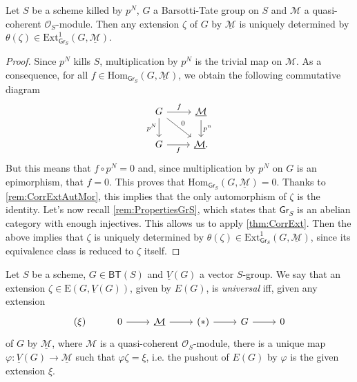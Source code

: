\documentclass[../Main]{subfiles}
\begin{document}
\begin{lem}\label{lem:rigidityExt}
	Let $S$ be a scheme killed by $p^N$, $G$ a Barsotti-Tate group on $S$
	and $\mathcal{M}$ a quasi-coherent $\mathcal{O}_S$-module.
	Then any extension $\zeta$ of $G$ by $\underline{\mathcal{M}}$ is
	uniquely determined by $\theta(\zeta) \in 
	\mathrm{Ext}^1_{\mathsf{Gr}_S}(G, \underline{\mathcal{M}})$.
\end{lem} 
\begin{proof}
	Since $p^N$ kills $S$, multiplication by $p^N$ 
	is the trivial map on $\mathcal{M}$.
	As a consequence, for all $f \in \mathrm{Hom}_{\mathsf{Gr}_S}
	\left( G, \underline{\mathcal{M}} \right)$,
	we obtain the following commutative diagram
	\begin{equation*}
	\begin{tikzcd}
		G \arrow[r, "f", rightarrow] 
		\arrow[d, "p^N"', rightarrow] 
		\arrow[rd, "0", rightarrow] &
		\underline{\mathcal{M}} \arrow[d, "p^n", rightarrow] \\
		G \arrow[r, "f"', rightarrow] &
		\underline{\mathcal{M}}
	.\end{tikzcd}
	\end{equation*}
	But this means that $f \circ p^N = 0$ and, since multiplication
	by $p^N$ on $G$ is an epimorphism, that $f = 0$.
	This proves that $\mathrm{Hom}_{ \mathsf{Gr}_S } \left( G, \underline{\mathcal{M}} \right) = 0$.
	Thanks to \cref{rem:CorrExtAutMor}, this implies that
	the only automorphism of $\zeta$ is the identity.
	Let's now recall \cref{rem:PropertiesGrS},
	which states that $\mathsf{Gr}_S$ is an abelian category with enough injectives.
	This allows us to apply \cref{thm:CorrExt}.
	Then the above implies that $\zeta$ is uniquely determined by $\theta(\zeta)
	\in \mathrm{Ext}^1_{\mathsf{Gr}_S}(G, \underline{\mathcal{M}})$,
	since its equivalence class is reduced to $\zeta$ itself.
\end{proof}


\begin{defn}
	Let $S$ be a scheme, $G \in \mathsf{BT}(S)$
	and $\underline{V}(G)$ a vector $S$-group.
	We say that an extension $\zeta \in \mathrm{E}(G, \underline{V}(G))$, given
	by $E(G)$, is {\em universal} iff, given any extension
	\begin{equation*}
	\begin{tikzcd}
		(\xi) &
		0 \arrow[r, "", rightarrow] &
		\underline{\mathcal{M}} \arrow[r, "", rightarrow] &
		(*) \arrow[r, "", rightarrow] &
		G \arrow[r, "", rightarrow] &
		0
	\end{tikzcd}
	\end{equation*}
	of $G$ by $\underline{\mathcal{M}}$, where $\mathcal{M}$ is a quasi-coherent
	$\mathcal{O}_{ S }$-module,
	there is a unique map $\varphi\colon \underline{V}(G) \to \underline{\mathcal{M}}$
	such that $\varphi\zeta = \xi$, i.e.
	the pushout of $E(G)$ by $\varphi$ is the given
	extension $\xi$.
\end{defn}
\end{document}
